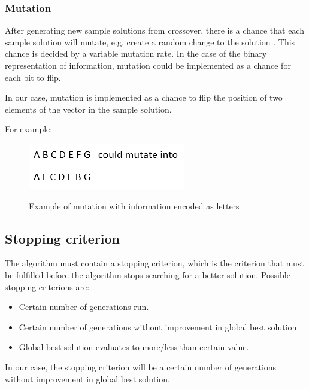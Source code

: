 \FloatBarrier

\subsubsection{Mutation}
After generating new sample solutions from crossover, there is a chance that each sample solution will mutate, e.g. create a random change to the solution . This chance is decided by a variable mutation rate. In the case of the binary representation of information, mutation could be implemented as a chance for each bit to flip.

In our case, mutation is implemented as a chance to flip the position of two elements of the vector in the sample solution. 

For example:
\begin{figure}[h]
	\centering
	{\includegraphics[scale=0.5]{Images/mutation_letters.PNG}}\\[0.5cm]
	\caption{Example of mutation with information encoded as letters}
	\label{fig:mutation_letters}
\end{figure}

\subsection{Stopping criterion}
The algorithm must contain a stopping criterion, which is the criterion that must be fulfilled before the algorithm stops searching for a better solution. Possible stopping criterions are:

\begin{itemize}
	\item Certain number of generations run.
	\item Certain number of generations without improvement in global best solution.
	\item Global best solution evaluates to more/less than certain value.
\end{itemize}

In our case, the stopping criterion will be a certain number of generations without improvement in global best solution.